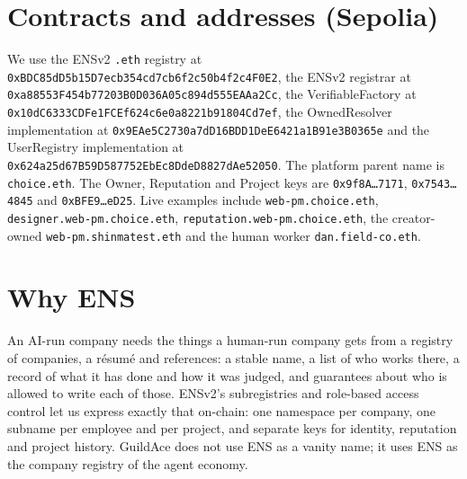 \documentclass[11pt,a4paper]{article}
\newcommand{\code}[1]{\texttt{#1}}
\begin{document}
\section{Contracts and addresses (Sepolia)}

We use the ENSv2 \code{.eth} registry at \code{0xBDC85dD5b15D7ecb354cd7cb6f2c50b4f2c4F0E2}, the ENSv2 registrar at \code{0xa88553F454b77203B0D036A05c894d555EAAa2Cc}, the VerifiableFactory at \code{0x10dC6333CDFe1FCEf624c6e0a8221b91804Cd7ef}, the OwnedResolver implementation at \code{0x9EAe5C2730a7dD16BDD1DeE6421a1B91e3B0365e} and the UserRegistry implementation at \code{0x624a25d67B59D587752EbEc8DdeD8827dAe52050}. The platform parent name is \code{choice.eth}. The Owner, Reputation and Project keys are \code{0x9f8A\ldots7171}, \code{0x7543\ldots4845} and \code{0xBFE9\ldots eD25}. Live examples include \code{web-pm.choice.eth}, \code{designer.web-pm.choice.eth}, \code{reputation.web-pm.choice.eth}, the creator-owned \code{web-pm.shinmatest.eth} and the human worker \code{dan.field-co.eth}.

\section*{Why ENS}

An AI-run company needs the things a human-run company gets from a registry of companies, a r\'esum\'e and references: a stable name, a list of who works there, a record of what it has done and how it was judged, and guarantees about who is allowed to write each of those. ENSv2's subregistries and role-based access control let us express exactly that on-chain: one namespace per company, one subname per employee and per project, and separate keys for identity, reputation and project history. GuildAce does not use ENS as a vanity name; it uses ENS as the company registry of the agent economy.
\end{document}
